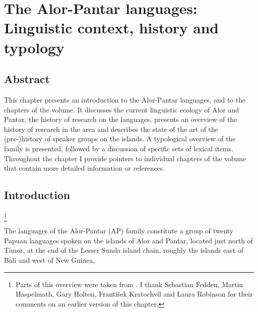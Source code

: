 \chapter{The Alor-Pantar languages:  Linguistic context, history and typology}


\begin{table}\centering
\caption{}
\end{table}


\begin{table}\centering
\caption{}
\end{table}


\begin{table}\centering
\caption{}
\end{table}

\section*{Abstract}
This chapter presents an introduction to the Alor-Pantar languages, and to the chapters of the volume. It discusses the current linguistic ecology of Alor and Pantar, the history of research on the languages, presents an overview of the history of research in the area and describes the state of the art of the (pre-)history of speaker groups on the islands. A typological overview of the family is presented, followed by a discussion of specific sets of lexical items. Throughout the chapter I provide pointers to individual chapters of the volume that contain more detailed information or references.

\section{Introduction}\footnote{Parts of this overview were taken from \citet{Klamer2010,Klamer2011,BairdEtAlMs,HoltonEtAlta}. I thank Sebastian Fedden, Martin Haspelmath, Gary Holton, Franti\v{s}ek Kratochv\'il and Laura Robinson for their comments on an earlier version of this chapter.}

The languages of the Alor-Pantar (AP) family constitute a group of twenty Papuan languages spoken on the islands of Alor and Pantar, located just north of Timor, at the end of the Lesser Sunda island chain, roughly the islands east of Bali and west of New Guinea,

